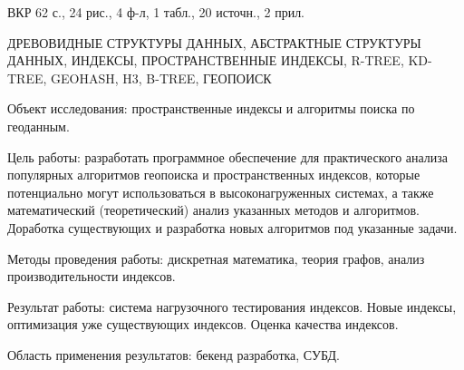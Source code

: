 \Referat %

ВКР 62 с., 24 рис., 4 ф-л, 1 табл., 20 источн., 2 прил. %

\noindent ДРЕВОВИДНЫЕ СТРУКТУРЫ ДАННЫХ, АБСТРАКТНЫЕ СТРУКТУРЫ ДАННЫХ, ИНДЕКСЫ, ПРОСТРАНСТВЕННЫЕ ИНДЕКСЫ, R-TREE, KD-TREE, GEOHASH, H3, B-TREE, ГЕОПОИСК


Объект исследования: пространственные индексы и алгоритмы поиска по геоданным. 

Цель работы: разработать программное обеспечение для практического анализа популярных алгоритмов геопоиска и пространственных индексов, которые потенциально могут использоваться в высоконагруженных системах, а также математический (теоретический) анализ указанных методов и алгоритмов. Доработка существующих и разработка новых алгоритмов под указанные задачи.

Методы проведения работы: дискретная математика, теория графов, анализ производительности индексов. 

Результат работы: система нагрузочного тестирования индексов. Новые индексы, оптимизация уже существующих индексов. Оценка качества индексов. 

Область применения результатов: бекенд разработка, СУБД.



